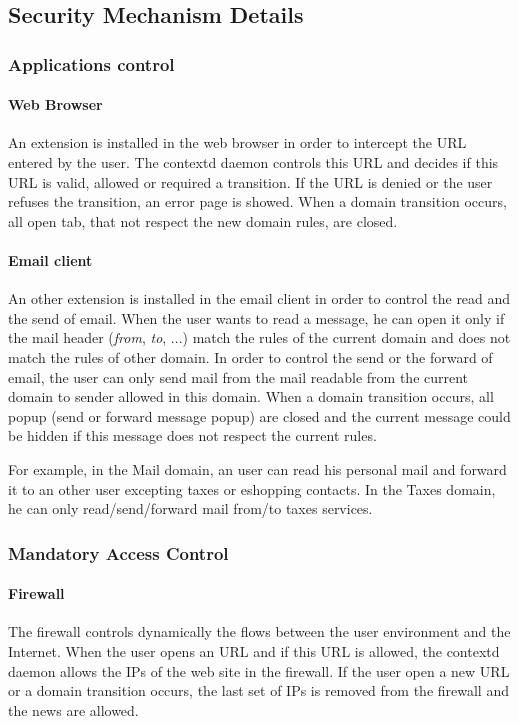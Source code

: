 \documentclass[conference]{IEEEtran}
\begin{document}
			
	\subsection{Security Mechanism Details}
	
		\subsubsection{Applications control}

\paragraph{Web Browser}
An extension is installed in the web browser in order to intercept the URL entered by the user.
The contextd daemon controls this URL and decides if this URL is valid, allowed or required a transition.
If the URL is denied or the user refuses the transition, an error page is showed.
When a domain transition occurs, all open tab, that not respect the new domain rules, are closed.

\paragraph{Email client}
An other extension is installed in the email client in order to control the read and the send of email.
When the user wants to read a message, he can open it only if the mail header (\textit{from}, \textit{to}, ...) match the rules of the current domain and does not match the rules of other domain.
In order to control the send or the forward of email, the user can only send mail from the mail readable from the current domain to sender allowed in this domain.
When a domain transition occurs, all popup (send or forward message popup) are closed and the current message could be hidden if this message does not respect the current rules.

For example, in the Mail domain, an user can read his personal mail and forward it to an other user excepting taxes or eshopping contacts.
In the Taxes domain, he can only read/send/forward mail from/to taxes services.

	
		\subsubsection{Mandatory Access Control}

\paragraph{Firewall}
The firewall controls dynamically the flows between the user environment and the Internet.
When the user opens an URL and if this URL is allowed, the contextd daemon allows the IPs of the web site in the firewall.
If the user open a new URL or a domain transition occurs, the last set of IPs is removed from the firewall and the news are allowed.
\end{document}
